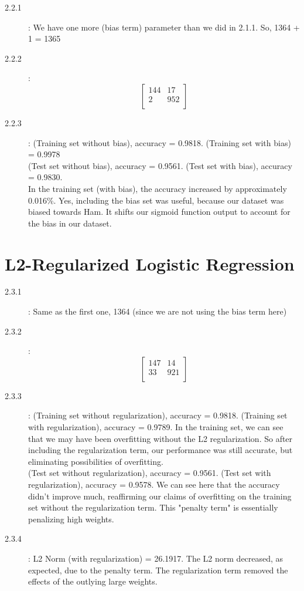 \documentclass{article}
\begin{document}
\begin{description}
    \item[2.2.1]: We have one more (bias term) parameter than we did in 2.1.1. So, 1364 + 1 = 1365
    \item[2.2.2]: \[
\begin{bmatrix}
    {144}      & {17}\\
    {2}       & {952} \\
    \end{bmatrix}
    \]
    \item[2.2.3]: (Training set without bias), accuracy = 0.9818. (Training set with bias) = 0.9978 \\ (Test set without bias), accuracy = 0.9561. (Test set with bias), accuracy = 0.9830. \\ In the training set (with bias), the accuracy increased by approximately 0.016\%. Yes, including the bias set was useful, because our dataset was biased towards Ham. It shifts our sigmoid function output to account for the bias in our dataset.
\end{description}


\section{L2-Regularized Logistic Regression}

\begin{description}
    \item[2.3.1]: Same as the first one, 1364 (since we are not using the bias term here)
    \item[2.3.2]: \[
\begin{bmatrix}
    {147}      & {14}\\
    {33}       & {921} \\
    \end{bmatrix}
    \]
    \item[2.3.3]: (Training set without regularization), accuracy = 0.9818. (Training set with regularization), accuracy = 0.9789. In the training set, we can see that we may have been overfitting without the L2 regularization. So after including the regularization term, our performance was still accurate, but eliminating possibilities of overfitting. \\ (Test set without regularization), accuracy = 0.9561. (Test set with regularization), accuracy = 0.9578. We can see here that the accuracy didn't improve much, reaffirming our claims of overfitting on the training set without the regularization term. This "penalty term" is essentially penalizing high weights.
    \item[2.3.4]: L2 Norm (with regularization) = 26.1917. The L2 norm decreased, as expected, due to the penalty term. The regularization term removed the effects of the outlying large weights.
\end{description}
\end{document}
